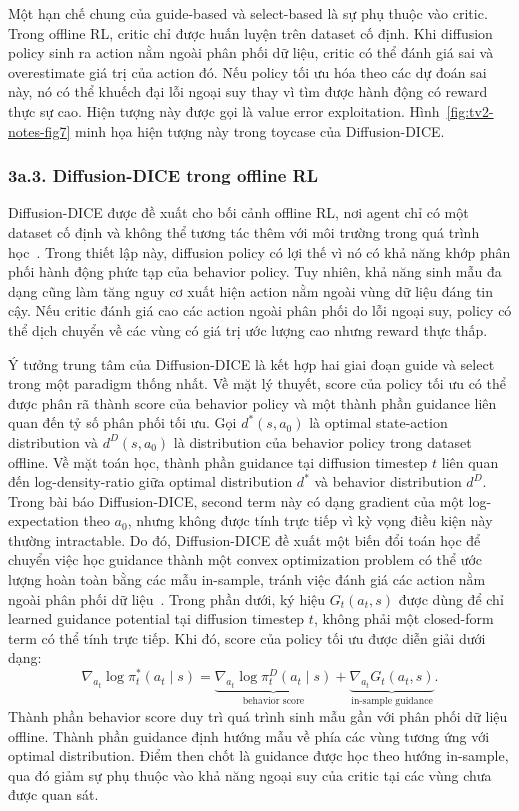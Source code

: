 Một hạn chế chung của guide-based và select-based là sự phụ thuộc vào critic.
Trong offline RL, critic chỉ được huấn luyện trên dataset cố định.
Khi diffusion policy sinh ra action nằm ngoài phân phối dữ liệu, critic có thể đánh giá sai và overestimate giá trị của action đó.
Nếu policy tối ưu hóa theo các dự đoán sai này, nó có thể khuếch đại lỗi ngoại suy thay vì tìm được hành động có reward thực sự cao.
Hiện tượng này được gọi là value error exploitation.
Hình~\ref{fig:tv2-notes-fig7} minh họa hiện tượng này trong toycase của Diffusion-DICE.

\subsubsection*{3a.3. Diffusion-DICE trong offline RL}

Diffusion-DICE được đề xuất cho bối cảnh offline RL, nơi agent chỉ có một dataset cố định và không thể tương tác thêm với môi trường trong quá trình học~\citep{mao2024diffusiondice}.
Trong thiết lập này, diffusion policy có lợi thế vì nó có khả năng khớp phân phối hành động phức tạp của behavior policy.
Tuy nhiên, khả năng sinh mẫu đa dạng cũng làm tăng nguy cơ xuất hiện action nằm ngoài vùng dữ liệu đáng tin cậy.
Nếu critic đánh giá cao các action ngoài phân phối do lỗi ngoại suy, policy có thể dịch chuyển về các vùng có giá trị ước lượng cao nhưng reward thực thấp.

Ý tưởng trung tâm của Diffusion-DICE là kết hợp hai giai đoạn guide và select trong một paradigm thống nhất.
Về mặt lý thuyết, score của policy tối ưu có thể được phân rã thành score của behavior policy và một thành phần guidance liên quan đến tỷ số phân phối tối ưu.
Gọi $d^*(s,a_0)$ là optimal state-action distribution và $d^D(s,a_0)$ là distribution của behavior policy trong dataset offline.
Về mặt toán học, thành phần guidance tại diffusion timestep $t$ liên quan đến log-density-ratio giữa optimal distribution $d^*$ và behavior distribution $d^D$.
Trong bài báo Diffusion-DICE, second term này có dạng gradient của một log-expectation theo $a_0$, nhưng không được tính trực tiếp vì kỳ vọng điều kiện này thường intractable.
Do đó, Diffusion-DICE đề xuất một biến đổi toán học để chuyển việc học guidance thành một convex optimization problem có thể ước lượng hoàn toàn bằng các mẫu in-sample, tránh việc đánh giá các action nằm ngoài phân phối dữ liệu~\citep{mao2024diffusiondice}.
Trong phần dưới, ký hiệu $G_t(a_t,s)$ được dùng để chỉ learned guidance potential tại diffusion timestep $t$, không phải một closed-form term có thể tính trực tiếp.
Khi đó, score của policy tối ưu được diễn giải dưới dạng:
\begin{equation}
    \nabla_{a_t}\log \pi_t^*(a_t\mid s)
    =
    \underbrace{\nabla_{a_t}\log \pi_t^D(a_t\mid s)}_{\text{behavior score}}
    +
    \underbrace{\nabla_{a_t}G_t(a_t,s)}_{\text{in-sample guidance}}.
\end{equation}
Thành phần behavior score duy trì quá trình sinh mẫu gần với phân phối dữ liệu offline.
Thành phần guidance định hướng mẫu về phía các vùng tương ứng với optimal distribution.
Điểm then chốt là guidance được học theo hướng in-sample, qua đó giảm sự phụ thuộc vào khả năng ngoại suy của critic tại các vùng chưa được quan sát.

